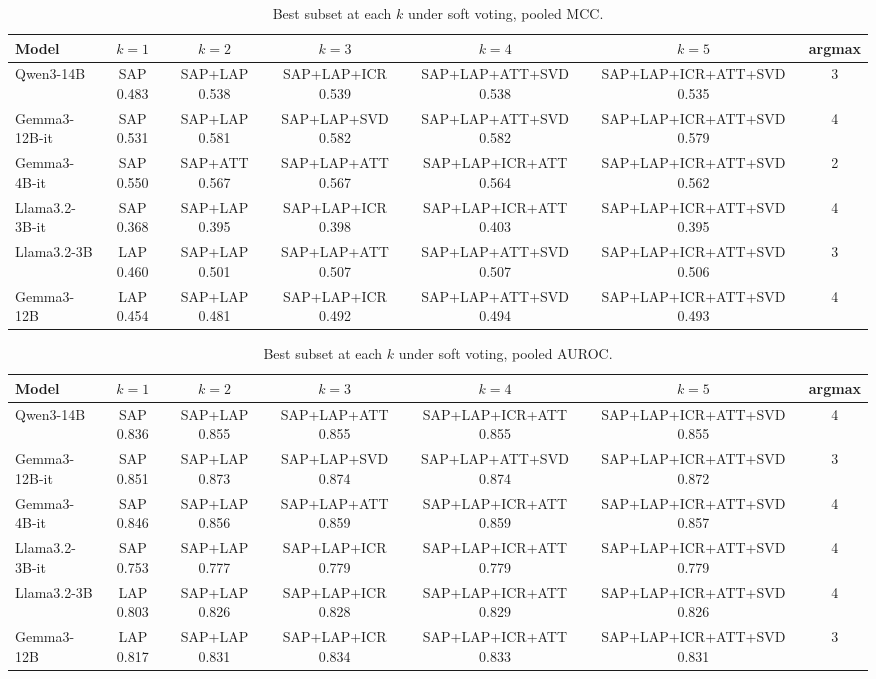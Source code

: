 \begin{table}[h]\centering\footnotesize
  \caption{Best subset at each $k$ under soft voting, pooled MCC.}
  \begin{tabular}{l c c c c c c}
    \hline
    Model & $k{=}1$ & $k{=}2$ & $k{=}3$ & $k{=}4$ & $k{=}5$ & argmax \\
    \hline
    Qwen3-14B & SAP 0.483 & SAP+LAP 0.538 & SAP+LAP+ICR 0.539 & SAP+LAP+ATT+SVD 0.538 & SAP+LAP+ICR+ATT+SVD 0.535 & 3 \\
    Gemma3-12B-it & SAP 0.531 & SAP+LAP 0.581 & SAP+LAP+SVD 0.582 & SAP+LAP+ATT+SVD 0.582 & SAP+LAP+ICR+ATT+SVD 0.579 & 4 \\
    Gemma3-4B-it & SAP 0.550 & SAP+ATT 0.567 & SAP+LAP+ATT 0.567 & SAP+LAP+ICR+ATT 0.564 & SAP+LAP+ICR+ATT+SVD 0.562 & 2 \\
    Llama3.2-3B-it & SAP 0.368 & SAP+LAP 0.395 & SAP+LAP+ICR 0.398 & SAP+LAP+ICR+ATT 0.403 & SAP+LAP+ICR+ATT+SVD 0.395 & 4 \\
    Llama3.2-3B & LAP 0.460 & SAP+LAP 0.501 & SAP+LAP+ATT 0.507 & SAP+LAP+ATT+SVD 0.507 & SAP+LAP+ICR+ATT+SVD 0.506 & 3 \\
    Gemma3-12B & LAP 0.454 & SAP+LAP 0.481 & SAP+LAP+ICR 0.492 & SAP+LAP+ATT+SVD 0.494 & SAP+LAP+ICR+ATT+SVD 0.493 & 4 \\
    \hline\end{tabular}\end{table}

\begin{table}[h]\centering\footnotesize
  \caption{Best subset at each $k$ under soft voting, pooled AUROC.}
  \begin{tabular}{l c c c c c c}
    \hline
    Model & $k{=}1$ & $k{=}2$ & $k{=}3$ & $k{=}4$ & $k{=}5$ & argmax \\
    \hline
    Qwen3-14B & SAP 0.836 & SAP+LAP 0.855 & SAP+LAP+ATT 0.855 & SAP+LAP+ICR+ATT 0.855 & SAP+LAP+ICR+ATT+SVD 0.855 & 4 \\
    Gemma3-12B-it & SAP 0.851 & SAP+LAP 0.873 & SAP+LAP+SVD 0.874 & SAP+LAP+ATT+SVD 0.874 & SAP+LAP+ICR+ATT+SVD 0.872 & 3 \\
    Gemma3-4B-it & SAP 0.846 & SAP+LAP 0.856 & SAP+LAP+ATT 0.859 & SAP+LAP+ICR+ATT 0.859 & SAP+LAP+ICR+ATT+SVD 0.857 & 4 \\
    Llama3.2-3B-it & SAP 0.753 & SAP+LAP 0.777 & SAP+LAP+ICR 0.779 & SAP+LAP+ICR+ATT 0.779 & SAP+LAP+ICR+ATT+SVD 0.779 & 4 \\
    Llama3.2-3B & LAP 0.803 & SAP+LAP 0.826 & SAP+LAP+ICR 0.828 & SAP+LAP+ICR+ATT 0.829 & SAP+LAP+ICR+ATT+SVD 0.826 & 4 \\
    Gemma3-12B & LAP 0.817 & SAP+LAP 0.831 & SAP+LAP+ICR 0.834 & SAP+LAP+ICR+ATT 0.833 & SAP+LAP+ICR+ATT+SVD 0.831 & 3 \\
    \hline\end{tabular}\end{table}

